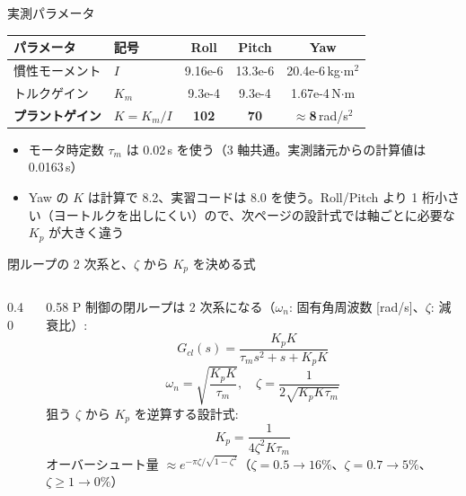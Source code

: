 \begin{frame}{実測パラメータ}
  \begin{table}
    \centering\footnotesize
    \begin{tabular}{llccc}
      \hline
      \textbf{パラメータ} & \textbf{記号} & \textbf{Roll} & \textbf{Pitch} & \textbf{Yaw} \\
      \hline
      慣性モーメント & $I$ & 9.16e-6 & 13.3e-6 & 20.4e-6\,kg$\cdot$m$^2$ \\
      トルクゲイン   & $K_m$ & 9.3e-4 & 9.3e-4 & 1.67e-4\,N$\cdot$m \\
      \hline
      \textbf{プラントゲイン} & $K=K_m/I$ & \textbf{102} & \textbf{70} & \textbf{$\approx$8}\,rad/s$^2$ \\
      \hline
    \end{tabular}
  \end{table}

  \vspace{0.4em}

  \begin{itemize}\footnotesize\setlength{\itemsep}{2pt}
    \item モータ時定数 $\tau_m$ は 0.02\,s を使う（3 軸共通。実測諸元からの計算値は 0.0163\,s）
    \item Yaw の $K$ は計算で 8.2、実習コードは 8.0 を使う。Roll/Pitch より 1 桁小さい（ヨートルクを出しにくい）ので、次ページの設計式では軸ごとに必要な $K_p$ が大きく違う
  \end{itemize}
\end{frame}

\begin{frame}{閉ループの 2 次系と、$\zeta$ から $K_p$ を決める式}
  \begin{columns}[c]
    \begin{column}{0.40\textwidth}
      \centering
    \end{column}
    \begin{column}{0.58\textwidth}
      \footnotesize
      \setlength{\abovedisplayskip}{3pt}\setlength{\belowdisplayskip}{3pt}%
      P 制御の閉ループは 2 次系になる（$\omega_n$: 固有角周波数 [rad/s]、$\zeta$: 減衰比）:
      \[
        G_{cl}(s)=\frac{K_pK}{\tau_m s^2+s+K_pK}
      \]
      \[
        \omega_n=\sqrt{\frac{K_pK}{\tau_m}},\quad
        \zeta=\frac{1}{2\sqrt{K_pK\tau_m}}
      \]
      狙う $\zeta$ から $K_p$ を逆算する設計式:
      \[
        \boxed{K_p=\frac{1}{4\zeta^2K\tau_m}}
      \]
      オーバーシュート量 $\approx e^{-\pi\zeta/\sqrt{1-\zeta^2}}$（$\zeta=0.5\to16\%$、$\zeta=0.7\to5\%$、$\zeta\ge1\to0\%$）
    \end{column}
  \end{columns}
\end{frame}

